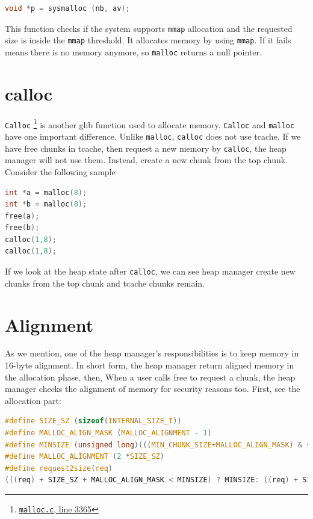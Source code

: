 \documentclass{masterthesis}
\newcommand*\tch{tcache}
\newcommand*\mallocc{\lstinline{malloc}\xspace}
\newcommand*\callocc{\lstinline{calloc}\xspace}
\newcommand*\mmapc{\lstinline{mmap}\xspace}
\newcommand*\Callocc{\lstinline{Calloc}\xspace}
\begin{document}
\begin{lstlisting}[language=c,frame=tlrb]
 void *p = sysmalloc (nb, av);
 \end{lstlisting}

This function checks if the system supports \mmapc{} allocation and the requested size is inside the \mmapc{} threshold. It allocates memory by using \mmapc{}. If it fails means there is no memory anymore, so \mallocc{} returns a null pointer.

\section{calloc}
\Callocc{} \footnote{\href{https://sourceware.org/git/?p=glibc.git;a=blob;f=malloc/malloc.c;h=f7cd29bc2f93e1082ee77800bd64a4b2a2897055;hb=9ea3686266dca3f004ba874745a4087a89682617\#l3365}{\texttt{malloc.c}, line 3365}} is another glib function used to allocate memory. \Callocc{} and \mallocc{} have one important difference. Unlike \mallocc{}, \callocc{} does not use \tch{}. If we have free chunks in \tch{}, then request a new memory by \callocc{}, the heap manager will not use them. Instead, create a new chunk from the top chunk. Consider the following sample

\begin{lstlisting}[language=c,frame=tlrb]
int *a = malloc(8);
int *b = malloc(8);
free(a);
free(b);
calloc(1,8);
calloc(1,8);
\end{lstlisting}

If we look at the heap state after \callocc{}, we can see heap manager create new chunks from the top chunk and \tch{} chunks remain.

\section{Alignment}
As we mention, one of the heap manager's responsibilities is to keep memory in 16-byte alignment. In short form, the heap manager return aligned memory in the allocation phase, then, When a user calls free to request a chunk, the heap manager checks the alignment of memory for security reasons too. First, see the allocation part:

\begin{lstlisting}[language=c,frame=tlrb]
#define SIZE_SZ (sizeof(INTERNAL_SIZE_T))
#define MALLOC_ALIGN_MASK (MALLOC_ALIGNMENT - 1)
#define MINSIZE (unsigned long)(((MIN_CHUNK_SIZE+MALLOC_ALIGN_MASK) & ~MALLOC_ALIGN_MASK))
#define MALLOC_ALIGNMENT (2 *SIZE_SZ)
#define request2size(req)
(((req) + SIZE_SZ + MALLOC_ALIGN_MASK < MINSIZE) ? MINSIZE: ((req) + SIZE_SZ + MALLOC_ALIGN_MASK) & ~MALLOC_ALIGN_MASK)
\end{lstlisting}
\end{document}
